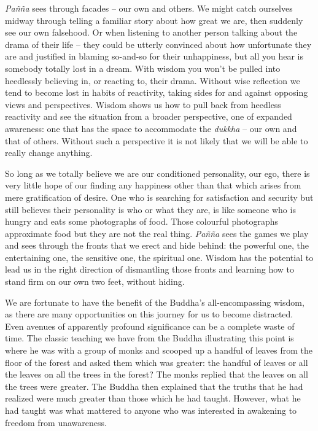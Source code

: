 \emph{Pañña} sees through facades -- our own and others. We might catch
ourselves midway through telling a familiar story about how great we
are, then suddenly see our own falsehood. Or when listening to another
person talking about the drama of their life -- they could be utterly
convinced about how unfortunate they are and justified in blaming
so-and-so for their unhappiness, but all you hear is somebody totally
lost in a dream. With wisdom you won't be pulled into heedlessly
believing in, or reacting to, their drama. Without wise reflection we
tend to become lost in habits of reactivity, taking sides for and
against opposing views and perspectives. Wisdom shows us how to pull
back from heedless reactivity and see the situation from a broader
perspective, one of expanded awareness: one that has the space to
accommodate the \emph{dukkha} -- our own and that of others. Without
such a perspective it is not likely that we will be able to really
change anything.

So long as we totally believe we are our conditioned personality, our
ego, there is very little hope of our finding any happiness other than
that which arises from mere gratification of desire. One who is
searching for satisfaction and security but still believes their
personality is who or what they are, is like someone who is hungry and
eats some photographs of food. Those colourful photographs approximate
food but they are not the real thing. \emph{Pañña} sees the games we
play and sees through the fronts that we erect and hide behind: the
powerful one, the entertaining one, the sensitive one, the spiritual
one. Wisdom has the potential to lead us in the right direction of
dismantling those fronts and learning how to stand firm on our own two
feet, without hiding.

We are fortunate to have the benefit of the Buddha's all-encompassing
wisdom, as there are many opportunities on this journey for us to become
distracted. Even avenues of apparently profound significance can be a
complete waste of time. The classic teaching we have from the Buddha
illustrating this point is where he was with a group of monks and
scooped up a handful of leaves from the floor of the forest and asked
them which was greater: the handful of leaves or all the leaves on all
the trees in the forest? The monks replied that the leaves on all the
trees were greater. The Buddha then explained that the truths that he
had realized were much greater than those which he had taught. However,
what he had taught was what mattered to anyone who was interested in
awakening to freedom from unawareness.

